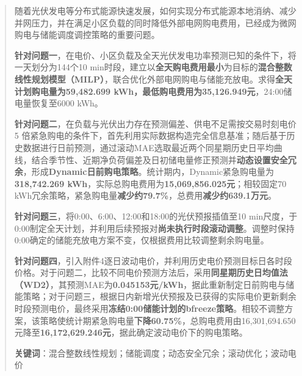 \begin{abstract}



随着光伏发电等分布式能源快速发展，如何实现分布式能源本地消纳、减少并网压力，并在满足小区负载的同时降低外部电网购电费用，已经成为微网购电与储能调度调控策略的重要问题。



\textbf{针对问题一}，在电价、小区负载及全天光伏发电功率预测已知的条件下，将一天划分为144个10 min时段，建立以\textbf{全天购电费用最小}为目标的\textbf{混合整数线性规划模型（MILP）}，联合优化外部电网购电与储能充放电。求得\textbf{全天计划购电量为59,482.699 kWh，最低购电费用为35,126.949元}，24:00储电量恢复至6000 kWh。

\textbf{针对问题二}，在负载与光伏出力存在预测偏差、供电不足需按交易时刻电价 5 倍紧急购电的条件下，首先利用实际数据构造完全信息基准；随后基于历史数据进行日前预测，通过滚动MAE选取最近两个同星期历史日平均曲线，结合季节性、近期净负荷偏差及日初储电量修正预测并\textbf{动态设置安全冗余}，形成\textbf{Dynamic日前购电策略}。统计期内，Dynamic紧急购电量为\textbf{318,742.269 kWh}，实际总购电费用为\textbf{15,069,856.025元}；相较固定70 kWh冗余策略，紧急购电量\textbf{减少约79.7\%}，总费用\textbf{减少约639.1万元}。

\textbf{针对问题三}，将0:00、6:00、12:00和18:00的光伏预报插值至10 min尺度，于0:00制定全天计划，并利用后续预报对\textbf{尚未执行时段滚动调整}。调整时保持0:00确定的储能充放电方案不变，仅根据费用比较调整剩余购电量。

\textbf{针对问题四}，引入附件4逐日波动电价，并利用历史电价预测目标日各时段价格。对于问题二，比较不同电价预测方法后，采用\textbf{同星期历史日均值法（WD2）}，其预测MAE为\textbf{0.045153元/kWh}，据此重新制定日前购电与储能策略；对于问题三，根据日内新增光伏预报及已获得的实际电价更新剩余时段预测电价，最终采用\textbf{冻结0:00储能计划的bfreeze策略}。相较不调整方案，该策略使统计期紧急购电量\textbf{下降60.75\%}，总购电费用由16,301,694.650元降至\textbf{16,172,629.246元}，据此确定波动电价下的购电策略。



\vfill

\noindent\textbf{关键词}：混合整数线性规划；储能调度；动态安全冗余；滚动优化；波动电价

\vspace{0.5cm}


\end{abstract}
